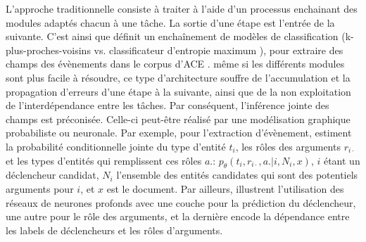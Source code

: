 L'approche traditionnelle consiste à traiter à l'aide d'un processus enchainant des modules adaptés chacun à une tâche. La sortie d'une étape est l'entrée de la suivante. C'est ainsi que \citet{ahn2006stages} définit un enchaînement de modèles de classification (k-plus-proches-voisins \citep{cover1967knn} vs. classificateur d'entropie maximum \citep{nigam1999maxent}), pour extraire des champs des évènements dans le corpus d'ACE \citep{ace2005event}. même si les différents modules sont plus facile à résoudre, ce type d'architecture souffre de l'accumulation et la propagation d'erreurs d'une étape à la suivante, ainsi que de la non exploitation de l'interdépendance entre les tâches. Par conséquent, l'inférence jointe des champs est préconisée. Celle-ci peut-être réalisé par une modélisation graphique probabiliste ou neuronale. Par exemple, pour l'extraction d'évènement, \citet{yang2016jointEntityEvt} estiment la probabilité conditionnelle jointe du type d'entité $t_i$, les rôles des arguments $r_{i\cdot}$ et les types d'entités qui remplissent ces rôles $a.$: $p_\theta(t_i,r_{i\cdot},a. \vert i, N_i, x)$, $i$ étant un déclencheur candidat, $N_i$ l'ensemble des entités candidates qui sont des potentiels arguments pour $i$, et $x$ est le document. Par ailleurs, \citet{nguyen2016jointtrgarg} illustrent l'utilisation des réseaux de neurones profonds avec une couche pour la prédiction du déclencheur, une autre pour le rôle des arguments, et la dernière encode la dépendance entre les labels de déclencheurs et les rôles d'arguments. 

